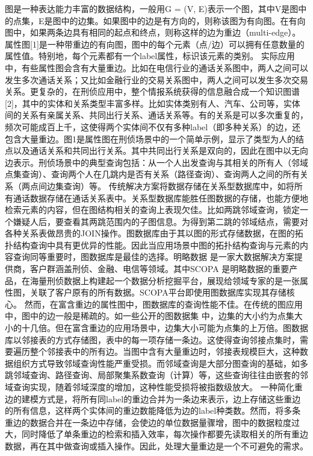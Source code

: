 
图是一种表达能力丰富的数据结构，一般用G = (V, E)表示一个图，其中V是图中的点集，E是图中的边集。如果图中的边是有方向的，则称该图为有向图。在有向图中，如果两条边具有相同的起点和终点，则称这样的边为重边（multi-edge）。属性图[1]是一种带重边的有向图，图中的每个元素（点/边）可以拥有任意数量的属性值。特别地，每个元素都有一个label属性，标识该元素的类别。
实际应用中，有些属性图会含有大量重边。比如在电信行业的通话关系图中，两人之间可以发生多次通话关系；又比如金融行业的交易关系图中，两人之间可以发生多次交易关系。更复杂的，在刑侦应用中，整个情报系统获得的信息融合成一个知识图谱[2]，其中的实体和关系类型丰富多样。比如实体类别有人、汽车、公司等，实体间的关系有亲属关系、共同出行关系、通话关系等。有的关系是可以多次重复的，频次可能成百上千，这使得两个实体间不仅有多种label（即多种关系）的边，还包含大量重边。图1是属性图在刑侦场景中的一个简单示例，显示了类型为人的结点以及通话关系和共同出行关系。其中共同出行关系是双向的，因此在图中以无向边表示。刑侦场景中的典型查询包括：从一个人出发查询与其相关的所有人（邻域点集查询）、查询两个人在几跳内是否有关系（路径查询）、查询两人之间的所有关系（两点间边集查询）等。
传统解决方案将数据存储在关系型数据库中，如将所有通话数据存储在通话关系表中。关系型数据库能胜任图数据的存储，也能方便地检索元素的内容，但在图结构相关的查询上表现欠佳。比如两跳邻域查询，锁定一个嫌疑人后，要查看其两跳范围内的子图信息。为得到第二跳的邻域结点，需要对各种关系表做昂贵的JOIN操作。图数据库由于其以图的形式存储数据，在图的拓扑结构查询中具有更优异的性能。因此当应用场景中图的拓扑结构查询与元素的内容查询同等重要时，图数据库是最佳的选择。明略数据 是一家大数据解决方案提供商，客户群涵盖刑侦、金融、电信等领域。其中SCOPA 是明略数据的重要产品，在海量刑侦数据上构建起一个数据分析挖掘平台，展现给领域专家的是一张属性图，关联了客户原有的所有数据。SCOPA平台即使用图数据库实现其存储核心。
然而，在富含重边的属性图中，图数据库的查询性能不佳。在传统的图应用中，图中的边一般是稀疏的。如一些公开的图数据集 中，边集的大小约为点集大小的十几倍。但在富含重边的应用场景中，边集大小可能为点集的上万倍。图数据库以邻接表的方式存储图，表中的每一项存储一条边。这使得查询邻接点集时，需要遍历整个邻接表中的所有边。当图中含有大量重边时，邻接表规模巨大，这种数据组织方式导致邻域查询性能严重受损。而邻域查询是大部分图查询的基础，如多跳邻域查询、路径查询、局部聚集系数查询（计算）等，这些查询往往由嵌套的邻域查询实现，随着邻域深度的增加，这种性能受损将被指数级放大。
一种简化重边的建模方式是，将所有同label的重边合并为一条边来表示，边上存储这些重边的所有信息，这样两个实体间的重边数能降低为边的label种类数。然而，将多条重边的数据合并在一条边中存储，会使边的单位数据量骤增，图中的数据粒度过大，同时降低了单条重边的检索和插入效率，每次操作都要先读取相关的所有重边数据，再在其中做查询或插入操作。因此，处理大量重边是一个不可避免的需求。
